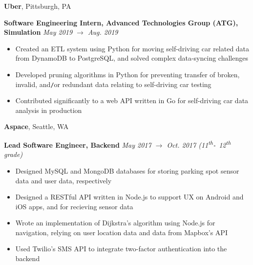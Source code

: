 \documentclass[10pt]{article}
\begin{document}
\begin{flushleft}
		\vspace{-1.50mm}
		\textbf{Uber}, Pittsburgh, PA\\
		\begin{leftli}
			{\small \textbf{Software Engineering Intern, Advanced Technologies Group (ATG), Simulation}} \hfill \textit{\small May 2019 $\rightarrow$ Aug. 2019}
			\begin{itemize}
				\item Created an ETL system using Python for moving self-driving car related data from DynamoDB to PostgreSQL, and solved complex data-syncing challenges
				\vspace{-2mm}
				\item Developed pruning algorithms in Python for preventing transfer of broken, invalid, and\texttt{/}or redundant data relating to self-driving car testing
				\vspace{-2mm}
				\item Contributed significantly to a web API written in Go for self-driving car data analysis in production
			\end{itemize}
		\end{leftli}

		\vspace{-1.50mm}
		\textbf{Aspace}, Seattle, WA\\
		\begin{leftli}
			{\small \textbf{Lead Software Engineer, Backend}} \hfill \textit{\small May 2017 $\rightarrow$ Oct. 2017 (11\textsuperscript{th}\texttt{-} 12\textsuperscript{th} grade)}

			\begin{itemize}
				\item Designed MySQL and MongoDB databases for storing parking spot sensor data and user data, respectively
				\vspace{-2mm}
				\item Designed a RESTful API written in Node.js to support UX on Android and iOS apps, and for recieving sensor data
				\vspace{-2mm}
				\item Wrote an implementation of Dijkstra's algorithm using Node.js for navigation, relying on user location data and data from Mapbox's API
				\vspace{-2mm}
				\item Used Twilio's SMS API to integrate two-factor authentication into the backend
			\end{itemize}
		\end{leftli}
		\vspace{-1mm}


\end{flushleft}
\end{document}
